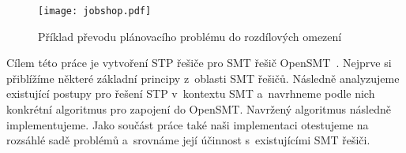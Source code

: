 \begin{figure}[b]
	\centering
	\texttt{[image: jobshop.pdf]}
	\caption{Příklad převodu plánovacího problému do rozdílových omezení} 
	\label{fig:job}
\end{figure}
\newpage
Cílem této práce je vytvoření STP řešiče pro SMT řešič OpenSMT~\cite{OpenSMT}. Nejprve si přiblížíme některé základní principy z~oblasti SMT řešičů. Následně analyzujeme existující postupy pro řešení STP v~kontextu SMT a~navrhneme podle nich konkrétní algoritmus pro zapojení do OpenSMT. Navržený algoritmus následně implementujeme. Jako součást práce také naši implementaci otestujeme na rozsáhlé sadě problémů a~srovnáme její účinnost s~existujícími SMT řešiči.
